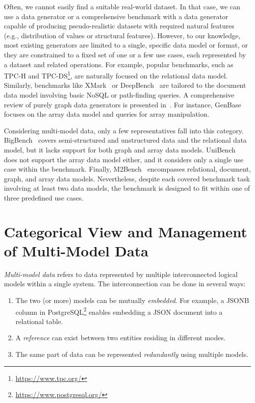 Often, we cannot easily find a suitable real-world dataset. In that case, we can use a data generator or a comprehensive benchmark with a data generator capable of producing pseudo-realistic datasets with required natural features (e.g., distribution of values or structural features). However, to our knowledge, most existing generators are limited to a single, specific data model or format, or they are constrained to a fixed set of one or a few use cases, each represented by a dataset and related operations. For example, popular benchmarks, such as TPC-H and TPC-DS\footnote{\url{https://www.tpc.org/}}, are naturally focused on the relational data model. Similarly, benchmarks like XMark~\citep{10.5555/1287369.1287455} or DeepBench~\citep{10.1145/3531348.3532176} are tailored to the document data model involving basic NoSQL or path-finding queries. A comprehensive review of purely graph data generators is presented in~\citep{10.1145/3379445}. %
For instance, GenBase~\citep{10.1145/2588555.2595633} focuses on the array data model and queries for array manipulation.

Considering multi-model data, only a few representatives fall into this category. BigBench~\citep{10.1145/2463676.2463712} covers semi-structured and unstructured data and the relational data model, but it lacks support for both graph and array data models. UniBench~\citep{unibench} does not support the array data model either, and it considers only a single use case within the benchmark. Finally, M2Bench~\citep{10.14778/3574245.3574259} encompasses relational, document, graph, and array data models. Nevertheless, despite each covered benchmark task involving at least two data models, the benchmark is designed to fit within one of three predefined use cases.

\section{Categorical View and Management of Multi-Model Data}
\textit{Multi-model data} refers to data represented by multiple interconnected logical models within a single system. The interconnection can be done in several ways:

\begin{enumerate}
    \item The two (or more) models can be mutually \textit{embedded}. For example, a JSONB column in PostgreSQL\footnote{\url{https://www.postgresql.org/}} enables embedding a JSON document into a relational table.
    \item A \textit{reference} can exist between two entities residing in different modes.
    \item The same part of data can be represented \textit{redundantly} using multiple models.
\end{enumerate}

